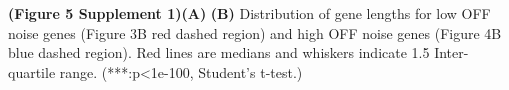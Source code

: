 \textbf{(Figure 5 Supplement 1)}\textbf{(A)} \textbf{(B)} Distribution of gene
lengths for low OFF noise genes (Figure 3B red dashed region) and high OFF noise genes (Figure 4B
blue dashed region). Red lines are medians and whiskers indicate 1.5 Inter-quartile range. (***:p<1e-100, Student’s
t-test.)